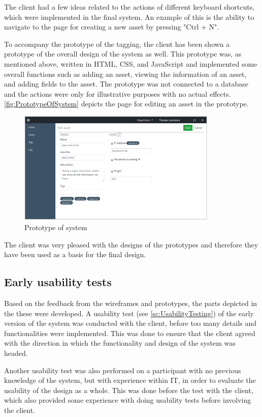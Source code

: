 The client had a few ideas related to the actions of different keyboard shortcuts, which were implemented in the final system. An example of this is the ability to navigate to the page for creating a new asset by pressing "Ctrl + N".
\par
To accompany the prototype of the tagging, the client has been shown a prototype of the overall design of the system as well. This prototype was, as mentioned above, written in HTML, CSS, and JavaScript and implemented some overall functions such as adding an asset, viewing the information of an asset, and adding fields to the asset. The prototype was not connected to a database and the actions were only for illustrative purposes with no actual effects. \autoref{fig:PrototypeOfSystem} depicts the page for editing an asset in the prototype.

\begin{figure}[H]
    \centering
    \includegraphics[width=0.85\textwidth]{figures/Prototypes/AssetEditor_Prototype.png}
    \caption{Prototype of system}
    \label{fig:PrototypeOfSystem}
\end{figure}

The client was very pleased with the designs of the prototypes and therefore they have been used as a basis for the final design.

\subsection{Early usability tests}
Based on the feedback from the wireframes and prototypes, the parts depicted in the these were developed. A usability test (see \autoref{sc:UsabilityTesting}) of the early version of the system was conducted with the client, before too many details and functionalities were implemented. This was done to ensure that the client agreed with the direction in which the functionality and design of the system was headed. 
\par
Another usability test was also performed on a participant with no previous knowledge of the system, but with experience within IT, in order to evaluate the usability of the design as a whole. This was done before the test with the client, which also provided some experience with doing usability tests before involving the client. 

